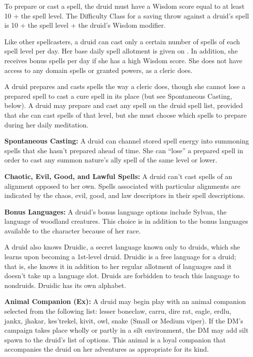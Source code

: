 To prepare or cast a spell, the druid must have a Wisdom score equal to at least 10 + the spell level. The Difficulty Class for a saving throw against a druid's spell is 10 + the spell level + the druid's Wisdom modifier.

Like other spellcasters, a druid can cast only a certain number of spells of each spell level per day. Her base daily spell allotment is given on . In addition, she receives bonus spells per day if she has a high Wisdom score. She does not have access to any domain spells or granted powers, as a cleric does.

A druid prepares and casts spells the way a cleric does, though she cannot lose a prepared spell to cast a cure spell in its place (but see Spontaneous Casting, below). A druid may prepare and cast any spell on the druid spell list, provided that she can cast spells of  that level, but she must choose which spells to prepare during her daily meditation.

\textbf{Spontaneous Casting:} A druid can channel stored spell energy into summoning spells that she hasn't prepared ahead of time. She can ``lose'' a prepared spell in order to cast any summon nature's ally spell of the same level or lower.

\textbf{Chaotic, Evil, Good, and Lawful Spells:} A druid can't cast spells of an alignment opposed to her own. Spells associated with particular alignments are indicated by the chaos, evil, good, and law descriptors in their spell descriptions.

\textbf{Bonus Languages:} A druid's bonus language options include Sylvan, the language of woodland creatures. This choice is in addition to the bonus languages available to the character because of her race.

A druid also knows Druidic, a secret language known only to druids, which she learns upon becoming a 1st-level druid. Druidic is a free language for a druid; that is, she knows it in addition to her regular allotment of languages and it doesn't take up a language slot. Druids are forbidden to teach this language to nondruids. Druidic has its own alphabet.

\textbf{Animal Companion (Ex):} A druid may begin play with an animal companion selected from the following list: lesser boneclaw, carru, dire rat, eagle, erdlu, jankx, jhakar, kes'trekel, kivit, owl, snake (Small or Medium viper). If the DM's campaign takes place wholly or partly in a silt environment, the DM may add silt spawn to the druid's list of options. This animal is a loyal companion that accompanies the druid on her adventures as appropriate for its kind. 

